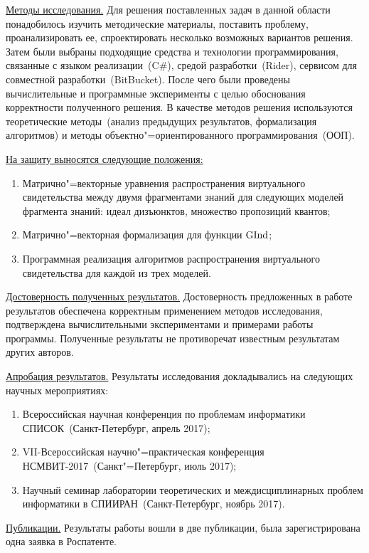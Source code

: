\underline{Методы исследования.} Для решения поставленных задач в данной области понадобилось изучить методические материалы, поставить проблему, проанализировать ее, спроектировать несколько возможных вариантов решения. Затем были выбраны подходящие средства и технологии программирования, связанные с языком реализации~(C\#), средой разработки~(Rider), сервисом для совместной разработки~(BitBucket). После чего были проведены вычислительные и программные эксперименты с целью обоснования корректности  полученного решения. В качестве методов решения используются теоретические методы~(анализ предыдущих результатов, формализация алгоритмов) и методы объектно"=ориентированного программирования~(ООП).


\underline{На защиту выносятся следующие положения:} 
\begin{enumerate}
\item Матрично"=векторные уравнения распространения виртуального свидетельства между двумя фрагментами знаний для следующих моделей фрагмента знаний: идеал дизъюнктов, множество пропозиций квантов;
\item Матрично"=векторная формализация для функции $\mathrm{GInd}$;
\item Программная реализация алгоритмов распространения виртуального свидетельства для каждой из трех моделей.
\end{enumerate}

\underline{Достоверность полученных результатов.} 
Достоверность предложенных в работе результатов обеспечена корректным применением методов исследования, подтверждена вычислительными экспериментами и примерами работы программы. Полученные результаты не противоречат известным результатам других авторов.

\underline{Апробация результатов.} Результаты исследования докладывались на следующих научных мероприятиях:
\begin{enumerate}
\item Всероссийская научная конференция по проблемам информатики
СПИСОК~(Санкт-Петербург, апрель 2017);
\item VII-Всероссийская научно"=практическая конференция НСМВИТ-2017~(Санкт"=Петербург, июль 2017);
\item Научный семинар лаборатории теоретических и междисциплинарных проблем информатики в СПИИРАН~(Санкт-Петербург, ноябрь 2017).
\end{enumerate}

\underline{Публикации.} Результаты работы вошли в две публикации, была зарегистрирована одна заявка в Роспатенте.

